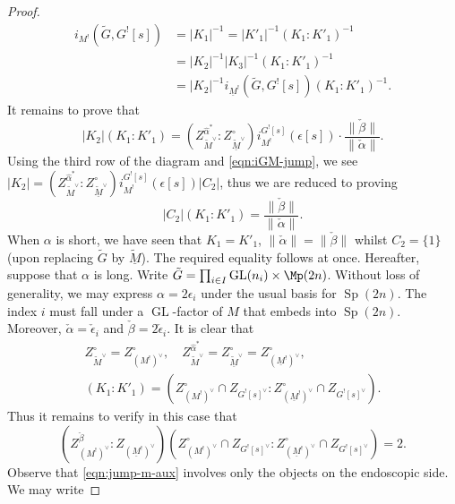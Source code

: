 \documentclass[11pt, a3paper, openany]{article}
\newcommand{\GL}{\operatorname{GL}}
\newcommand{\Sp}{\operatorname{Sp}}
\theoremstyle{remark}
\theoremstyle{remark}
\theoremstyle{remark}
\newenvironment{Proof of claim}
  {\begin{proof}[\normalfont \textbf{Proof of claim}]}
  {\end{proof}}
\theoremstyle{definition}
\theoremstyle{remark}
\theoremstyle{plain}
\begin{document}
\begin{proof}
\begin{align*}
		i_{M^!}(\tilde{G}, G^![s]) & = |K_1|^{-1} = |K'_1|^{-1} (K_1 : K'_1)^{-1} \\
		& = |K_2|^{-1} |K_3|^{-1} (K_1 : K'_1)^{-1} \\
		& = |K_2|^{-1} i_{\underline{M}^!}(\tilde{G}, G^![s]) (K_1 : K'_1)^{-1}.
	\end{align*}
	It remains to prove that
	\begin{equation*}
		|K_2| (K_1 : K'_1) = \left( Z_{\tilde{M}^\vee}^{\hat{\alpha}^*} : Z_{\underline{\tilde{M}}^\vee}^\circ \right)  i^{G^![s]}_{M^!}(\epsilon[s]) \cdot \frac{\|\check{\beta}\|}{\|\check{\alpha}\|} .
	\end{equation*}
	Using the third row of the diagram and \eqref{eqn:iGM-jump}, we see $|K_2| = \left( Z_{\tilde{M}^\vee}^{\hat{\alpha}^*} : Z_{\underline{\tilde{M}}^\vee}^\circ \right)  i^{G^![s]}_{M^!}(\epsilon[s]) |C_2|$, thus we are reduced to proving
	\begin{equation*}
		|C_2| (K_1 : K'_1) = \frac{\|\check{\beta}\|}{\|\check{\alpha}\|}.
	\end{equation*}
	When $\alpha$ is short, we have seen that $K_1 = K'_1$, $\|\check{\alpha}\| = \|\check{\beta}\|$ whilst $C_2 = \{1\}$ (upon replacing $\tilde{G}$ by $\underline{\tilde{M}}$). The required equality follows at once.
	Hereafter, suppose that $\alpha$ is long. Write $\tilde{G} = \prod_{i \in I} \GL(n_i) \times \Mp(2n)$. Without loss of generality, we may express $\alpha = 2\epsilon_i$ under the usual basis for $\Sp(2n)$. The index $i$ must fall under a $\GL$-factor of $M$ that embeds into $\Sp(2n)$. Moreover, $\check{\alpha} = \check{\epsilon}_i$ and $\check{\beta} = 2\check{\epsilon}_i$. It is clear that
	\begin{gather*}
		Z_{\tilde{M}^\vee}^\circ = Z_{(M^!)^\vee}^\circ , \quad Z_{\tilde{M}^\vee}^{\hat{\alpha}^*} = Z_{\underline{\tilde{M}}^\vee}^\circ = Z_{(\underline{M}^!)^\vee}^\circ, \\
		(K_1 : K'_1 ) = \left( Z_{(M^!)^\vee}^\circ \cap Z_{G^![s]^\vee} : Z_{(\underline{M}^!)^\vee}^\circ \cap Z_{G^![s]^\vee} \right).
	\end{gather*}
	Thus it remains to verify in this case that
	\begin{equation}\label{eqn:jump-m-aux}
		\left( Z_{(M^!)^\vee}^{\check{\beta}} : Z_{(\underline{M}^!)^\vee} \right) \left( Z_{(M^!)^\vee}^\circ \cap Z_{G^![s]^\vee} : Z_{(\underline{M}^!)^\vee}^\circ \cap Z_{G^![s]^\vee} \right) = 2.
	\end{equation}
	Observe that \eqref{eqn:jump-m-aux} involves only the objects on the endoscopic side. We may write

\end{proof}
\end{document}
